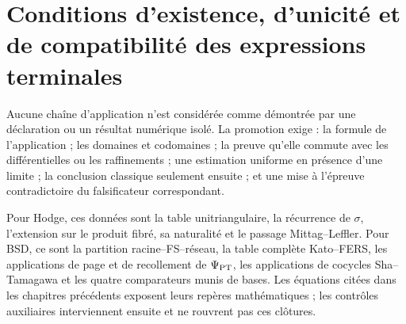 \section{Conditions d'existence, d'unicité et de compatibilité des expressions terminales}

Aucune chaîne d'application n'est considérée comme démontrée par une déclaration ou un résultat numérique isolé. La promotion exige : la formule de l'application ; les domaines et codomaines ; la preuve qu'elle commute avec les différentielles ou les raffinements ; une estimation uniforme en présence d'une limite ; la conclusion classique seulement ensuite ; et une mise à l'épreuve contradictoire du falsificateur correspondant.

Pour Hodge, ces données sont la table unitriangulaire, la récurrence de $\sigma$, l'extension sur le produit fibré, sa naturalité et le passage Mittag--Leffler. Pour BSD, ce sont la partition racine--FS--réseau, la table complète Kato--FERS, les applications de page et de recollement de $\Psi_{\rm PT}$, les applications de cocycles Sha--Tamagawa et les quatre comparateurs munis de bases. Les équations citées dans les chapitres précédents exposent leurs repères mathématiques ; les contrôles auxiliaires interviennent ensuite et ne rouvrent pas ces clôtures.

